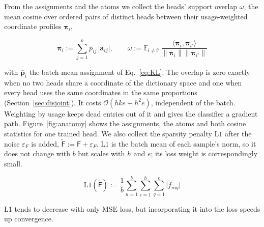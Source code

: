 

From the assignments and the atoms we collect the heads' support overlap
$\omega$, the mean cosine over ordered pairs of distinct heads between
their usage-weighted coordinate profiles $\boldsymbol{\pi}_i$,

\begin{equation}
	\boldsymbol{\pi}_i := \sum^{k}_{j=1} \bar{p}_{ij}\,
	\lvert \mathbf{a}_{ij}\rvert,
	\qquad
	\omega := \mathbb{E}_{i \neq i'}\,
	\frac{\langle \boldsymbol{\pi}_i, \boldsymbol{\pi}_{i'}\rangle}
	     {\lVert \boldsymbol{\pi}_i\rVert \lVert \boldsymbol{\pi}_{i'}\rVert}
	\label{eq:support}
\end{equation}

with $\bar{\mathbf{p}}_i$ the batch-mean assignment of
Eq.~\eqref{eq:KL}. The overlap is zero exactly when no two heads share
a coordinate of the dictionary space and one when every head uses the
same coordinates in the same proportions (Section~\ref{sec:disjoint}). It
costs
$\mathcal{O}(hke + h^2e)$, independent of the batch. Weighting by usage
keeps dead entries out of it and gives the classifier a gradient path.
Figure~\ref{fig:anatomy} shows the assignments, the atoms and both
cosine statistics for one trained head.
We also collect the sparsity penalty $\mathrm{L1}$ after the noise
$\varepsilon_F$ is added, $\tilde{\mathsf{F}} := \mathsf{F} +
\varepsilon_F$. $\mathrm{L1}$ is the batch mean of each sample's norm, so
it does not change with $b$ but scales with $h$ and $e$; its loss weight
is correspondingly small.

\begin{equation}
	\mathrm{L1}(\tilde{\mathsf{F}}) :=
	\frac{1}{b}\sum^{b}_{n=1}\sum^{h}_{i=1}\sum^{e}_{q=1}
	\lvert \tilde{f}_{niq}\rvert
	\label{eq:L1}
\end{equation}

$\mathrm{L1}$ tends to decrease with only $\mathrm{MSE}$ loss, but
incorporating it into the loss speeds up convergence.

